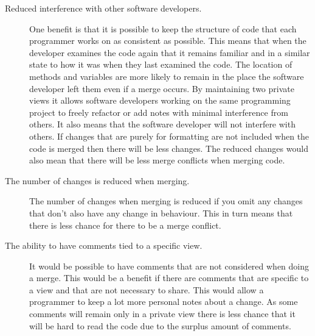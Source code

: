 \begin{description}

\item [Reduced interference with other software developers.]   
One benefit is that it is possible to keep the structure of code that each programmer works on as consistent as possible. 
This means that when the developer examines the code again that it remains familiar and in a similar state to how it was when they last examined the code.
The location of methods and variables are more likely to remain in the place the software developer left them even if a merge occurs.
By maintaining two private views it allows software developers working on the same programming project to freely refactor or add notes with minimal interference from others.
It also means that the software developer will not interfere with others.
If changes that are purely for formatting are not included when the code is merged then there will be less changes.
The reduced changes would also mean that there will be less merge conflicts when merging code.
  
\item [The number of changes is reduced when merging.] 
The number of changes when merging is reduced if you omit any changes that don't also have any change in behaviour.  This in turn means that there is less chance for there to be a merge conflict.
  
\item [The ability to have comments tied to a specific view.] 
It would be possible to have comments that are not considered when doing a merge. 
This would be a benefit if there are comments that are specific to a view and that are not necessary to share.  
This would allow a programmer to keep a lot more personal notes about a change.  
As some comments will remain only in a private view there is less chance that it will be hard to read the code due to the surplus amount of comments. 

\end{description}

